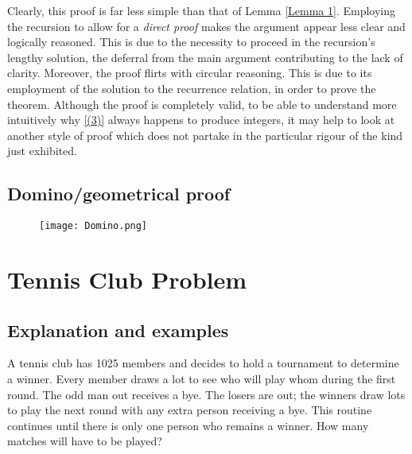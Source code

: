 \documentclass{article}
\begin{document}
Clearly, this proof is far less simple than that of Lemma \ref{Lemma 1}. Employing the recursion to allow for a \textit{direct proof} makes the argument appear less clear and logically reasoned. This is due to the necessity to proceed in the recursion's lengthy solution, the deferral from the main argument contributing to the lack of clarity. Moreover, the proof flirts with circular reasoning. This is due to its employment of the solution to the recurrence relation, in order to prove the theorem. Although the proof is completely valid, to be able to understand more intuitively why \eqref{(3)} always happens to produce integers, it may help to look at another style of proof which does not partake in the particular rigour of the kind just exhibited.

\subsection{Domino/geometrical proof}
\begin{figure}[htp]
    \centering
    \texttt{[image: Domino.png]}
    \caption{\citep{Brundan}}
    \label{fig:1}
\end{figure}

\section{Tennis Club Problem}

\subsection{Explanation and examples}
\begin{problem} \label{Problem 1}
    A tennis club has 1025 members and decides to hold a tournament to determine a winner. Every member draws a lot to see who will play whom during the first round. The odd man out receives a bye. The losers are out; the winners draw lots to play the next round with any extra person receiving a bye. This routine continues until there is only one person who remains a winner. How many matches will have to be played?
\end{problem}
\end{document}
